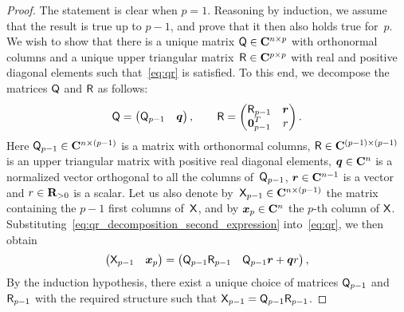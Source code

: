 \begin{proof}
    The statement is clear when $p=1$.
    Reasoning by induction,
    we assume that the result is true up to $p-1$, and prove that it then also holds true for~$p$.
    We wish to show that there is a unique matrix $\mathsf Q \in \mathbf C^{n \times p}$ with orthonormal columns and
    a unique upper triangular matrix~$\mathsf R \in \mathbf C^{p \times p}$ with real and positive diagonal elements such that~\eqref{eq:qr} is satisfied.
    To this end, we decompose the matrices $\mathsf Q$ and $\mathsf R$ as follows:
    \begin{equation}
        \label{eq:qr_decomposition_second_expression}
        \mathsf Q =
        \begin{pmatrix}
            \mathsf Q_{p-1} & \mathbf{\boldsymbol{q}}
        \end{pmatrix},
        \qquad
        \mathsf R =
        \begin{pmatrix}
            \mathsf R_{p-1} & \mathbf{\boldsymbol{r}} \\
            \mathbf{\boldsymbol{0}}_{p-1}^T & r
        \end{pmatrix}.
    \end{equation}
    Here $\mathsf Q_{p-1} \in \mathbf C^{n \times (p-1)}$ is a matrix with orthonormal columns,
    $\mathsf R \in \mathbf C^{(p-1) \times (p-1)}$ is an upper triangular matrix with positive real diagonal elements,
    $\mathbf{\boldsymbol{q}} \in \mathbf C^n$ is a normalized vector orthogonal to all the columns of~$\mathsf Q_{p-1}$,
    $\mathbf{\boldsymbol{r}} \in \mathbf C^{n-1}$ is a vector
    and $r \in \mathbf R_{>0}$ is a scalar.
    Let us also denote by~$\mathsf X_{p-1} \in \mathbf C^{n \times (p-1)}$ the matrix containing the $p-1$ first columns of~$\mathsf X$,
    and by $\mathbf{\boldsymbol{x}}_p \in \mathbf C^n$ the $p$-th column of $\mathsf X$.
    Substituting~\eqref{eq:qr_decomposition_second_expression} into~\eqref{eq:qr},
    we then obtain
    \begin{equation}
        \label{eq:qr_decomposition}
        \begin{pmatrix}
            \mathsf X_{p-1} &
            \mathbf{\boldsymbol{x}}_p
        \end{pmatrix}
        =
        \begin{pmatrix}
            \mathsf Q_{p-1} \mathsf R_{p-1} &
            \mathsf Q_{p-1} \mathbf{\boldsymbol{r}} + \mathbf{\boldsymbol{q}} r
        \end{pmatrix},
    \end{equation}
    By the induction hypothesis,
    there exist a unique choice of matrices $\mathsf Q_{p-1}$ and $\mathsf R_{p-1}$ with the required structure such that $\mathsf X_{p-1} = \mathsf Q_{p-1} \mathsf R_{p-1}$.

\end{proof}
